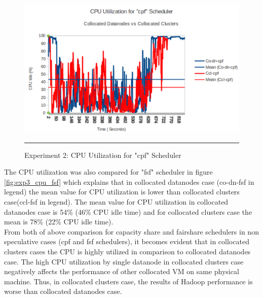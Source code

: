 \begin{figure}[htbp]
  \centering
    \includegraphics[width=\textwidth,height=\textheight,keepaspectratio]{./Figures/exp3_cpu_cpf_dn_vs_ccl.pdf}
    \rule{35em}{0.5pt}
  \caption{Experiment 2: CPU‌ Utilization for "cpf" Scheduler}
  \label{fig:exp3_cpu_cpf}
\end{figure} 

The CPU utilization was also compared for "fsf" scheduler in figure \ref{fig:exp3_cpu_fsf} which explains that in collocated datanodes case (co-dn-fsf in legend) the mean value for CPU utilization is lower than collocated clusters case(ccl-fsf in legend). The mean value for CPU utilization in collocated datanodes case is 54\% (46\% CPU idle time) and for collocated clusters case the mean is 78\% (22\% CPU idle time).\\
From both of above comparison for capacity share and fairshare schedulers in non speculative cases (cpf and fsf schedulers), it becomes evident that in collocated clusters cases the CPU is highly utilized in comparison to collocated datanodes case. The high CPU utilization by single datanode in collocated clusters case negatively affects the performance of other collocated VM on same physical machine. Thus, in collocated clusters case, the results of Hadoop performance is worse than collocated datanodes case. \\ 


